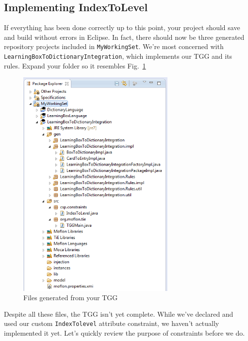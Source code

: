 \newpage
\hypertarget{subsec:IndexToLevel}{}
\subsection{Implementing IndexToLevel}
\genHeader

If everything has been done correctly up to this point, your project should save and build without errors in Eclipse. In fact, there should now be three
generated repository projects included in \texttt{MyWorkingSet}. We're most concerned with \texttt{LearningBox\-To\-Dictionary\-Integration}, which implements
our TGG and its rules. Expand your folder so it resembles Fig.~\ref{eclipse:tggGenerated}

\begin{figure}[htbp]
\begin{center}
  \includegraphics[width=0.7\textwidth]{eclipse_generatedTGG}
  \caption{Files generated from your TGG}
  \label{eclipse:tggGenerated}
\end{center}
\end{figure}

Despite all these files, the TGG isn't yet complete. While we've declared and used our custom \texttt{IndexTolevel} attribute constraint, we haven't actually
implemented it yet. Let's quickly review the purpose of constraints before we do.

